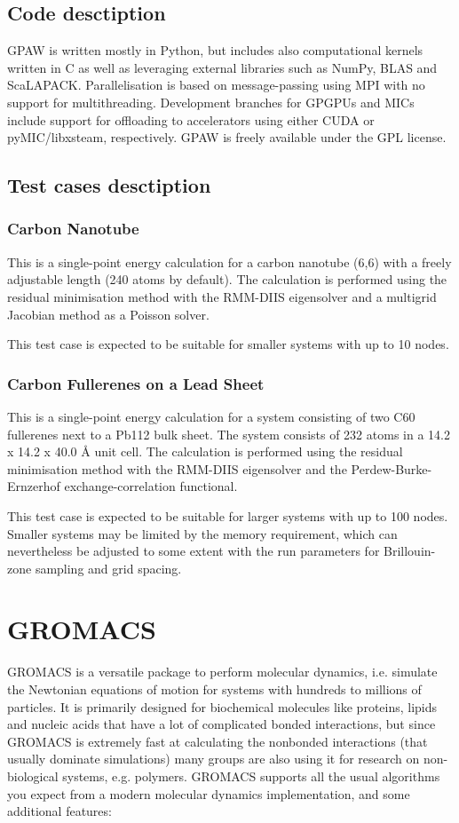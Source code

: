 \subsection{Code desctiption}
GPAW is written mostly in Python, but includes also computational kernels written in C as well as leveraging external libraries such as NumPy, BLAS and ScaLAPACK. Parallelisation is based on message-passing using MPI with no support for multithreading. Development branches for GPGPUs and MICs include support for offloading to accelerators using either CUDA or pyMIC/libxsteam, respectively. GPAW is freely available under the GPL license.

\subsection{Test cases desctiption}
\subsubsection{Carbon Nanotube}
This is a single-point energy calculation for a carbon nanotube (6,6) with a freely adjustable length (240 atoms by default). The calculation is performed using the residual minimisation method with the RMM-DIIS eigensolver and a multigrid Jacobian method as a Poisson solver.

This test case is expected to be suitable for smaller systems with up to 10 nodes.

\subsubsection{Carbon Fullerenes on a Lead Sheet}
This is a single-point energy calculation for a system consisting of two C60 fullerenes next to a Pb112 bulk sheet. The system consists of 232 atoms in a 14.2 x 14.2 x 40.0 Å unit cell. The calculation is performed using the residual minimisation method with the RMM-DIIS eigensolver and the Perdew-Burke-Ernzerhof exchange-correlation functional.

This test case is expected to be suitable for larger systems with up to 100 nodes. Smaller systems may be limited by the memory requirement, which can nevertheless be adjusted to some extent with the run parameters for Brillouin-zone sampling and grid spacing.


\section{GROMACS}
GROMACS is a versatile package to perform molecular dynamics, i.e. simulate the Newtonian equations of motion for systems with hundreds to millions of particles.
It is primarily designed for biochemical molecules like proteins, lipids and nucleic acids that have a lot of complicated bonded interactions, but since GROMACS is extremely fast at calculating the nonbonded interactions (that usually dominate simulations) many groups are also using it for research on non-biological systems, e.g. polymers.
GROMACS supports all the usual algorithms you expect from a modern molecular dynamics implementation, and some additional features:

